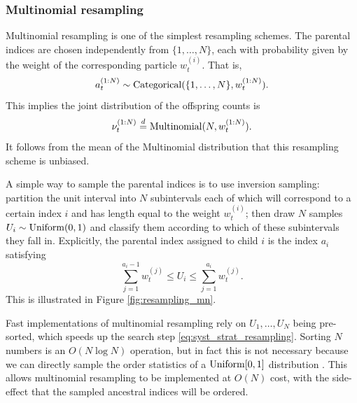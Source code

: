 \subsubsection{Multinomial resampling \seb{$\checkmark$} }%
Multinomial resampling \parencite{gordon1993,efron1994} is one of the simplest resampling schemes.
The parental indices are chosen independently from $\{1, \dots, N\}$, each with probability given by the weight of the corresponding particle $w_t^{(i)}$. 
That is, 
\begin{equation*}
a_t^{(1:N)} \sim \operatorname{Categorical}( \{1,\dots, N\}, w_t^{(1:N)} ) .
\end{equation*}
This implies the joint distribution of the offspring counts is 
\begin{equation*}
\nu_t^{(1:N)} \overset{d}{=} \operatorname{Multinomial}(N, w_t^{(1:N)} ) .
\end{equation*}
It follows from the mean of the Multinomial distribution that this resampling scheme is unbiased.

A simple way to sample the parental indices is to use inversion sampling: partition the unit interval into $N$ subintervals each of which will correspond to a certain index $i$ and has length equal to the weight $w_t^{(i)}$; then draw $N$ samples $U_i \sim \operatorname{Uniform}(0,1)$ and classify them according to which of these subintervals they fall in.
Explicitly, the parental index assigned to child $i$ is the index $a_i$ satisfying
\begin{equation}\label{eq:syst_strat_resampling}
\sum_{j=1}^{a_i -1} w_t^{(j)} \leq U_i \leq \sum_{j=1}^{a_i} w_t^{(j)} .
\end{equation}
This is illustrated in Figure \ref{fig:resampling_mn}. 

Fast implementations of multinomial resampling rely on $U_1,\dots,U_N$ being pre-sorted, which speeds up the search step \eqref{eq:syst_strat_resampling}. Sorting $N$ numbers is an $O(N\log N)$ operation, but in fact this is not necessary because we can directly sample the order statistics of a $\operatorname{Uniform}[0,1]$ distribution .
This allows multinomial resampling to be implemented at $O(N)$ cost, with the side-effect that the sampled ancestral indices will be ordered. 


